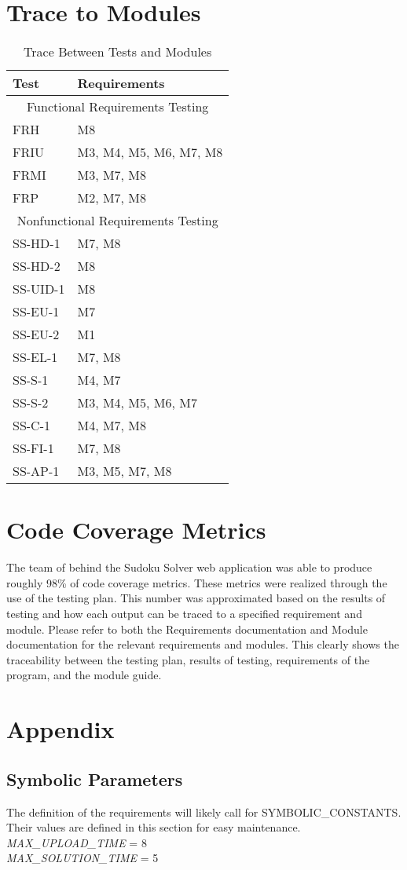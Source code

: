 \documentclass[11pt]{article}
\begin{document}
\section{Trace to Modules}
\begin{table}[H]
\centering
\begin{tabular}{p{} p{}}
\toprule
\textbf{Test} & \textbf{Requirements}\\
\midrule
\multicolumn{2}{c}{Functional Requirements Testing}\\
\midrule
FRH &  M8\\
FRIU &  M3, M4, M5, M6, M7, M8\\
FRMI &  M3, M7, M8\\
FRP &  M2, M7, M8\\
\midrule
\multicolumn{2}{c}{Nonfunctional Requirements Testing}\\
\midrule
SS-HD-1 &  M7, M8\\
SS-HD-2 &  M8\\
SS-UID-1 &  M8\\
SS-EU-1 &  M7\\
SS-EU-2 &  M1\\
SS-EL-1 &  M7, M8\\
SS-S-1 &  M4, M7\\
SS-S-2 &  M3, M4, M5, M6, M7\\
SS-C-1 &  M4, M7, M8\\
SS-FI-1 &  M7, M8\\
SS-AP-1 &  M3, M5, M7, M8\\
\bottomrule
\end{tabular}
\caption{Trace Between Tests and Modules}
\label{TblNFRT}
\end{table}

\section{Code Coverage Metrics}
The team of behind the Sudoku Solver web application was able to produce roughly 98\% of code coverage metrics. These metrics were realized through the use of the testing plan. This number was approximated based on the results of testing and how each output can be traced to a specified requirement and module. Please refer to both the Requirements documentation and Module documentation for the relevant requirements and modules. This clearly shows the traceability between the testing plan, results of testing, requirements of the program, and the module guide.



\section{Appendix}

\subsection{Symbolic Parameters}

The definition of the requirements will likely call for SYMBOLIC\_CONSTANTS.
Their values are defined in this section for easy maintenance.\\

\noindent \emph{MAX\_UPLOAD\_TIME} = 8\\
\emph{MAX\_SOLUTION\_TIME} = 5
\end{document}
